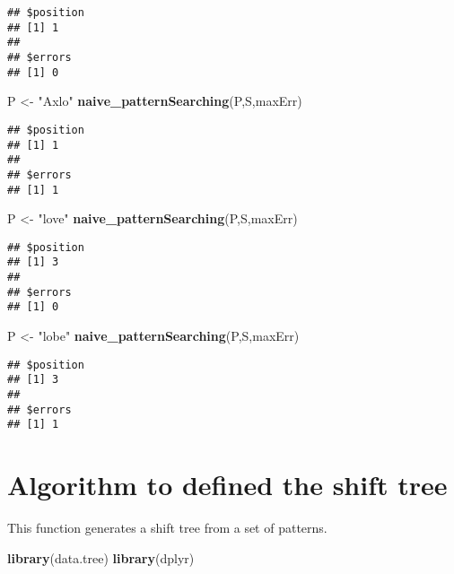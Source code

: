 \documentclass[]{article}
\newenvironment{Shaded}{\begin{snugshade}}{\end{snugshade}}
\newcommand{\KeywordTok}[1]{\textcolor[rgb]{0.13,0.29,0.53}{\textbf{#1}}}
\newcommand{\StringTok}[1]{\textcolor[rgb]{0.31,0.60,0.02}{#1}}
\newcommand{\NormalTok}[1]{#1}
\begin{document}
\begin{verbatim}
## $position
## [1] 1
## 
## $errors
## [1] 0
\end{verbatim}

\begin{Shaded}
\begin{Highlighting}[]
\NormalTok{P <-}\StringTok{ "Axlo"}
\KeywordTok{naive_patternSearching}\NormalTok{(P,S,maxErr)}
\end{Highlighting}
\end{Shaded}

\begin{verbatim}
## $position
## [1] 1
## 
## $errors
## [1] 1
\end{verbatim}

\begin{Shaded}
\begin{Highlighting}[]
\NormalTok{P <-}\StringTok{ "love"}
\KeywordTok{naive_patternSearching}\NormalTok{(P,S,maxErr)}
\end{Highlighting}
\end{Shaded}

\begin{verbatim}
## $position
## [1] 3
## 
## $errors
## [1] 0
\end{verbatim}

\begin{Shaded}
\begin{Highlighting}[]
\NormalTok{P <-}\StringTok{ "lobe"}
\KeywordTok{naive_patternSearching}\NormalTok{(P,S,maxErr)}
\end{Highlighting}
\end{Shaded}

\begin{verbatim}
## $position
## [1] 3
## 
## $errors
## [1] 1
\end{verbatim}

\section{Algorithm to defined the shift
tree}\label{algorithm-to-defined-the-shift-tree}

This function generates a shift tree from a set of patterns.

\begin{Shaded}
\begin{Highlighting}[]
\KeywordTok{library}\NormalTok{(data.tree)}
\KeywordTok{library}\NormalTok{(dplyr)}
\end{Highlighting}
\end{Shaded}
\end{document}
